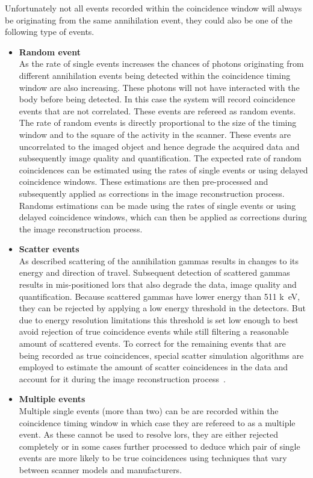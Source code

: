 %
Unfortunately not all events recorded within the coincidence window will always be originating from the same annihilation event, they could also be one of the following type of events. 
%
\begin{itemize}
\item\textbf{Random event}\\
As the rate of single events increases the chances of photons originating from different annihilation events being detected within the coincidence timing window are also increasing. These photons will not have interacted with the body before being detected.
In this case the system will record coincidence events that are not correlated. These events are refereed as random events. 
The rate of random events is directly proportional to the size of the timing window and to the square of the activity in the scanner. These events are uncorrelated to the imaged object and hence degrade the acquired data and subsequently image quality and quantification.  
The expected rate of random coincidences can be estimated using the rates of single events or using delayed coincidence windows. These estimations are then pre-processed and subsequently applied as corrections in the image reconstruction process. 
Randoms estimations can be made using the rates of single events or using delayed coincidence windows, which can then be applied as corrections during the image reconstruction process. 
%
%
\item\textbf{Scatter events}\\
As described scattering of the annihilation gammas results in changes to its energy and direction of travel. Subsequent detection of scattered gammas results in mis-positioned \glspl{lor} that also degrade the data, image quality and quantification. 
Because scattered gammas have lower energy than 511 \si{k\electronvolt}, they can be rejected by applying a low energy threshold in the detectors. But due to energy resolution limitations this threshold is set low enough to best avoid rejection of true coincidence events while still filtering a reasonable amount of scattered events.
To correct for the remaining events that are being recorded as true coincidences, special scatter simulation algorithms are employed to estimate the amount of scatter coincidences in the data and account for it during the image reconstruction process~\cite{Watson1996,Polycarpou2011}.

\item\textbf{Multiple events}\\
Multiple single events (more than two) can be are recorded within the coincidence timing window in which case they are refereed to as a multiple event. As these cannot be used to resolve \glspl{lor}, they are either rejected completely or in some cases further processed to deduce which pair of single events are more likely to  be true coincidences using techniques that vary between scanner models and manufacturers. 


\end{itemize}
